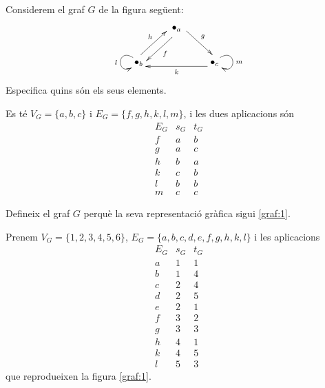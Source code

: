 \begin{exemple}
Considerem el graf $G$ de la figura següent:
\[
\xymatrix{
	& \bullet_{a} \ar@<1ex>[dl]^f \ar@<1ex>[dr]^g &  \\
	\bullet_{b} \ar@(ul,dl)_l \ar@<1ex>[ur]^h & & \bullet_{c}  \ar@<1ex>[ll]^k \ar@(ur,dr)^m \\
}
\]
Especifica quins són els seus elements.
\end{exemple}
\begin{solucio}
Es té $V_G=\{a,b,c\}$ i $E_G=\{f,g,h,k,l,m\}$, i les dues aplicacions són
\[
    \begin{array}{c|c|c}
        E_G & s_G & t_G \\ \hline
        f & a & b  \\
        g & a & c \\
        h & b & a \\
        k & c & b \\
        l & b & b \\
        m & c & c
    \end{array}
\]
\end{solucio}

\begin{exemple}
Defineix el graf $G$ perquè la seva representació gràfica sigui \eqref{graf:1}.
\end{exemple}
\begin{solucio}
Prenem $V_G=\{1,2,3,4,5,6\}$, $E_G=\{a,b,c,d,e,f,g,h,k,l\}$ i les aplicacions
\[
    \begin{array}{c|c|c}
        E_G & s_G & t_G \\ \hline
        a & 1 & 1  \\
        b & 1 & 4 \\
        c & 2 & 4 \\
        d & 2 & 5 \\
        e & 2 & 1 \\
        f & 3 & 2 \\
        g & 3 & 3 \\
        h & 4 & 1 \\
        k & 4 & 5 \\
        l & 5 & 3
    \end{array}
\]
que reprodueixen la figura \eqref{graf:1}.
\end{solucio}

